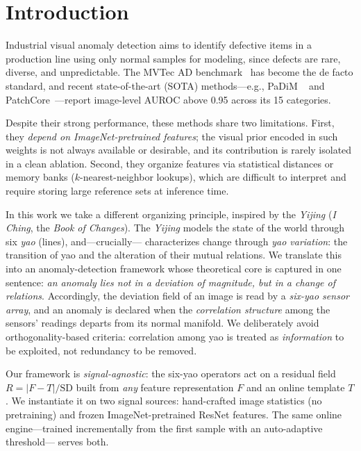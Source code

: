 \documentclass[preprint,12pt]{elsarticle}
\begin{document}
\section{Introduction}
Industrial visual anomaly detection aims to identify
defective items in a production line using only normal samples for
modeling, since defects are rare, diverse, and unpredictable. The
MVTec AD benchmark~\cite{bergmann2019mvtec} has become the de facto
standard, and recent state-of-the-art (SOTA) methods---e.g., PaDiM
~\cite{defard2021padim} and PatchCore~\cite{roth2022patchcore}---report
image-level AUROC above 0.95 across its 15 categories.

Despite their strong performance, these methods share two limitations.
First, they \emph{depend on ImageNet-pretrained features}; the visual
prior encoded in such weights is not always available or desirable, and
its contribution is rarely isolated in a clean ablation. Second, they
organize features via statistical distances or memory banks
($k$-nearest-neighbor lookups), which are difficult to interpret and
require storing large reference sets at inference time.

In this work we take a different organizing principle, inspired by the
\emph{Yijing} (\emph{I Ching}, the \emph{Book of Changes}). The \emph{Yijing} models the
state of the world through six \emph{yao} (lines), and---crucially---
characterizes change through \emph{yao variation}: the transition
of yao and the alteration of their mutual relations. We translate this
into an anomaly-detection framework whose theoretical core is captured in
one sentence: \emph{an anomaly lies not in a deviation of magnitude, but
in a change of relations}. Accordingly, the deviation field of an image is
read by a \emph{six-yao sensor array}, and an anomaly is declared when the
\emph{correlation structure} among the sensors' readings departs from its
normal manifold. We deliberately avoid orthogonality-based criteria:
correlation among yao is treated as \emph{information} to be exploited,
not redundancy to be removed.

Our framework is \emph{signal-agnostic}: the six-yao operators act on a
residual field $R = |F - T| / \mathrm{SD}$ built from \emph{any} feature
representation $F$ and an online template $T$. We instantiate it on two
signal sources: hand-crafted image statistics (no pretraining) and frozen
ImageNet-pretrained ResNet features. The same online engine---trained
incrementally from the first sample with an auto-adaptive threshold---
serves both.
\end{document}
